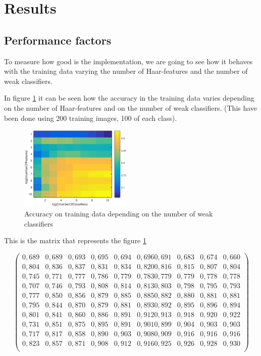 \documentclass{article}
\begin{document}
\section{Results}

\subsection{Performance factors}

To measure how good is the implementation, we are going to see how it behaves with the training data varying the number of Haar-features and the number of weak classifiers. 

In figure \ref{fig:accuracyOnTrainingFeaturesClassifiers} it can be seen how the accuracy in the training data varies depending on the number of Haar-features and on the number of weak classifiers. (This have been done using 200 training images, 100 of each class).

\begin{figure}[h]
\centering
\includegraphics[height=4cm]{images/accuracyOnTrainingFeaturesClassifiers}
\caption{Accuracy on training data depending on the number of weak classifiers}
\label{fig:accuracyOnTrainingFeaturesClassifiers}
\end{figure}

This is the matrix that represents the figure \ref{fig:accuracyOnTrainingFeaturesClassifiers} 

$$\begin{pmatrix}
0,689 & 0,689 & 0,693 & 0,695 & 0,694 & 0,696 0,691 & 0,683 & 0,674 & 0,660 \\ 
0,804 & 0,836 & 0,837 & 0,831 & 0,834 & 0,820 0,816 & 0,815 & 0,807 & 0,804 \\ 
0,745 & 0,771 & 0,777 & 0,786 & 0,779 & 0,783 0,779 & 0,779 & 0,778 & 0,778 \\
0,707 & 0,746 & 0,793 & 0,808 & 0,814 & 0,813 0,803 & 0,798 & 0,795 & 0,793 \\
0,777 & 0,850 & 0,856 & 0,879 & 0,885 & 0,885 0,882 & 0,880 & 0,881 & 0,881 \\
0,795 & 0,844 & 0,870 & 0,879 & 0,881 & 0,893 0,892 & 0,895 & 0,896 & 0,894 \\
0,801 & 0,841 & 0,860 & 0,886 & 0,891 & 0,912 0,913 & 0,918 & 0,920 & 0,922 \\
0,731 & 0,851 & 0,875 & 0,895 & 0,891 & 0,901 0,899 & 0,904 & 0,903 & 0,903 \\
0,717 & 0,817 & 0,858 & 0,890 & 0,903 & 0,908 0,909 & 0,916 & 0,916 & 0,916 \\
0,823 & 0,857 & 0,871 & 0,908 & 0,912 & 0,916 0,925 & 0,926 & 0,928 & 0,930 \\
\end{pmatrix}$$
\end{document}
